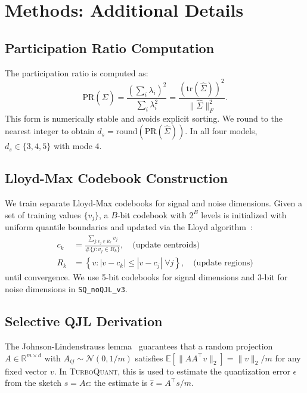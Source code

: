 \documentclass[11pt]{article}
\newcommand{\PR}{\mathrm{PR}}
\newcommand{\TQ}{\textsc{TurboQuant}}
\newcommand{\R}{\mathbb{R}}
\newcommand{\E}{\mathbb{E}}
\begin{document}
\newpage

\appendix

\section{Methods: Additional Details}
\label{app:methods_detail}

\subsection{Participation Ratio Computation}

The participation ratio is computed as:
\[
  \PR(\hat{\Sigma}) = \frac{\left(\sum_i \lambda_i\right)^2}{\sum_i \lambda_i^2}
  = \frac{(\mathrm{tr}(\hat{\Sigma}))^2}{\|\hat{\Sigma}\|_F^2}.
\]
This form is numerically stable and avoids explicit sorting.  We round to the
nearest integer to obtain $d_s = \text{round}(\PR(\hat{\Sigma}))$.  In all
four models, $d_s \in \{3, 4, 5\}$ with mode 4.

\subsection{Lloyd-Max Codebook Construction}

We train separate Lloyd-Max codebooks for signal and noise dimensions.  Given
a set of training values $\{v_j\}$, a $B$-bit codebook with $2^B$ levels is
initialized with uniform quantile boundaries and updated via the Lloyd
algorithm~\citep{lloyd1982least}:
\begin{align}
  c_k &= \frac{\sum_{j: v_j \in R_k} v_j}{\#\{j: v_j \in R_k\}}, \quad
  \text{(update centroids)} \\
  R_k &= \left\{v : |v - c_k| \leq |v - c_j| \;\forall j\right\}, \quad
  \text{(update regions)}
\end{align}
until convergence.  We use 5-bit codebooks for signal dimensions and 3-bit
for noise dimensions in \texttt{SQ\_noQJL\_v3}.

\subsection{Selective QJL Derivation}

The Johnson-Lindenstrauss lemma~\citep{johnson1984extensions} guarantees that
a random projection $A \in \R^{m \times d}$ with
$A_{ij} \sim \mathcal{N}(0, 1/m)$ satisfies $\E[\|A A^\top v\|_2] = \|v\|_2
/ m$ for any fixed vector $v$.  In \TQ{}, this is used to estimate the
quantization error $\epsilon$ from the sketch $s = A \epsilon$: the estimate
is $\hat{\epsilon} = A^\top s / m$.
\end{document}
